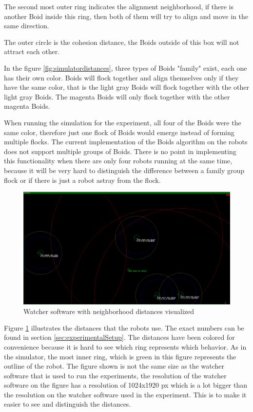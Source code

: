 The second most outer ring indicates the alignment neighborhood, if there is another Boid inside this ring, then both of them will try to align and move in the same direction.

The outer circle is the cohesion distance, the Boids outside of this box will not attract each other.


In the figure \ref{fig:simulatordistances}, three types of Boids "family" exist, each one has their own color. Boids will flock together and align themselves only if they have the same color, that is the light gray Boids will flock together with the other light gray Boids. The magenta Boids will only flock together with the other magenta Boids.

When running the simulation for the experiment, all four of the Boids were the same color, therefore just one flock of Boids would emerge instead of forming multiple flocks. The current implementation of the Boids algorithm on the robots does not support multiple groups of Boids. There is no point in implementing this functionality when there are only four robots running at the same time, because it will be very hard to distinguish the difference between a family group flock or if there is just a robot astray from the flock.

\begin{figure}[h]
\begin{center}
\includegraphics[width=1.1\linewidth]{figs/wathcer}
\end{center}
\caption[Watcher software]{Watcher software with neighborhood distances visualized}
\label{fig:watcher}
\end{figure}

Figure \ref{fig:watcher} illustrates the distances that the robots use. The exact numbers can be found in section \ref{sec:experimentalSetup}. The distances have been colored for convenience because it is hard to see which ring represents which behavior. As in the simulator, the most inner ring, which is green in this figure represents the outline of the robot. The figure shown is not the same size as the watcher software that is used to run the experiments, the resolution of the watcher software on the figure has a resolution of 1024x1920 px which is a lot bigger than the resolution on the watcher software used in the experiment. This is to make it easier to see and distinguish the distances.

